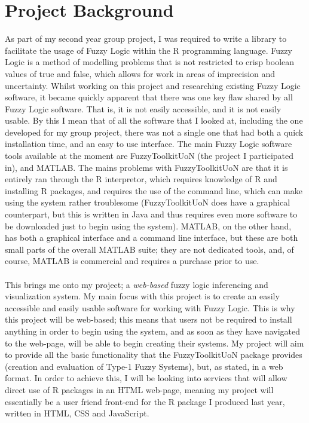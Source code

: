 \documentclass[a4paper,twoside,notitlepage,11pt]{article}
\begin{document}
\section{Project Background}
As part of my second year group project, I was required to write a library to facilitate the usage of Fuzzy Logic within the R programming language. Fuzzy Logic is a method of modelling problems that is not restricted to crisp boolean values of true and false, which allows for work in areas of imprecision and uncertainty. Whilst working on this project and researching existing Fuzzy Logic software, it became quickly apparent that there was one key flaw shared by all Fuzzy Logic software. That is, it is not easily accessible, and it is not easily usable. By this I mean that of all the software that I looked at, including the one developed for my group project, there was not a single one that had both a quick installation time, and an easy to use interface. The main Fuzzy Logic software tools available at the moment are FuzzyToolkitUoN (the project I participated in), and MATLAB. The mains problems with FuzzyToolkitUoN are that it is entirely ran through the R interpretor, which requires knowledge of R and installing R packages, and requires the use of the command line, which can make using the system rather troublesome (FuzzyToolkitUoN does have a graphical counterpart, but this is written in Java and thus requires even more software to be downloaded just to begin using the system). MATLAB, on the other hand, has both a graphical interface and a command line interface, but these are both small parts of the overall MATLAB suite; they are not dedicated tools, and, of course, MATLAB is commercial and requires a purchase prior to use. \ \\
\ \\
This brings me onto my project; a \emph{web-based} fuzzy logic inferencing and visualization system. My main focus with this project is to create an easily accessible and easily usable software for working with Fuzzy Logic. This is why this project will be web-based; this means that users not be required to install anything in order to begin using the system, and as soon as they have navigated to the web-page, will be able to begin creating their systems. My project will aim to provide all the basic functionality that the FuzzyToolkitUoN package provides (creation and evaluation of Type-1 Fuzzy Systems), but, as stated, in a web format. In order to achieve this, I will be looking into services that will allow direct use of R packages in an HTML web-page, meaning my project will essentially be a user friend front-end for the R package I produced last year, written in HTML, CSS and JavaScript.
\end{document}
